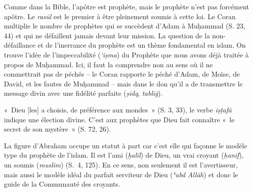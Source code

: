Comme dans la Bible, l'apôtre est prophète, mais le prophète n'est pas
forcément apôtre. Le \emph{rasūl} est le
premier à être pleinement soumis à cette loi. Le Coran multiplie le
nombre de prophètes qui se succèdent d'Adam à Muḥammad (S. 23, 44) et
qui ne défaillent jamais devant leur mission. La question de la
non-défaillance et de l'inerrance du prophète est un thème fondamental
en islam. On trouve l'idée de l'impeccabilité (\emph{`iṣma}) du
Prophète que nous avons déjà traitée à propos de Muḥammad. Ici, il faut
la comprendre non au sens où il ne commettrait pas de péchés -- le Coran
rapporte le péché d'Adam, de Moïse, de
David, et les fautes de Muḥammad -- mais dans le don qu'il a de transmettre le
message divin avec une fidélité parfaite (\emph{ṣidq}, \emph{tablīġ}).

«~Dieu {[}les{]} a choisis, de préférence aux mondes~» (S. 3, 33), le
verbe \emph{iṣṭafā} indique une élection divine. C'est aux prophètes que
Dieu fait connaître «~le secret de son mystère~» (S. 72, 26).

La figure d'Abraham occupe un statut à part car c'est elle qui façonne
le modèle type du prophète de l'islam. Il est l'ami (\emph{ḫalīl}) de
Dieu, un vrai croyant (\emph{ḥanīf}), un soumis (\emph{muslim}) (S.~4,
125). En ce sens, non seulement il est l'avertisseur, mais aussi le
modèle idéal du parfait serviteur de Dieu (\emph{ʿabd Allāh}) et donc le
guide de la Communauté des croyants.~

